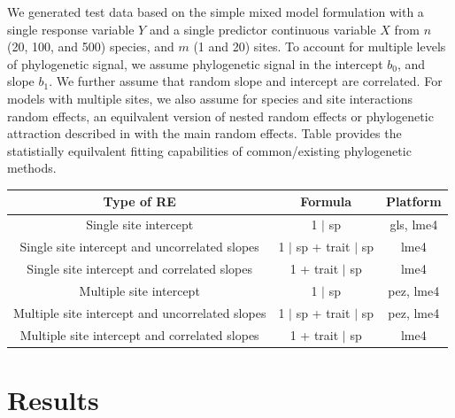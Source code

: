 We generated test data based on the simple mixed model formulation  with a single response variable $Y$ and a single predictor continuous variable $X$ from $n$ (20, 100, and 500) species, and $m$ (1 and 20) sites. 
To account for multiple levels of phylogenetic signal, we assume phylogenetic signal in the intercept $b_0$, and slope $b_1$.
We further assume that random slope and intercept are correlated. 
For models with multiple sites, we also assume for species and site interactions random effects, an equilvalent version of nested random effects or phylogenetic attraction described in \cite{helmus2007separating} with the main random effects.
Table  provides the statistially equilvalent fitting capabilities of common/existing phylogenetic methods.

\begin{tabular}{|c|c|c|}
\hline
Type of RE	& Formula	& Platform	\\
\hline

Single site intercept	  &	1 $\mid$ sp	& gls, lme4 \\
Single site intercept and uncorrelated slopes		&  1 $\mid$ sp + trait $\mid$ sp		& lme4 \\
Single site intercept and correlated slopes 			& 1 + trait $\mid$ sp					& lme4 \\
\hline
Multiple site intercept 									&  1 $\mid$ sp 						& pez, lme4 \\
Multiple site intercept and uncorrelated slopes 	&  1 $\mid$ sp + trait $\mid$ sp 		& pez, lme4 \\
Multiple site intercept and correlated slopes 	& 	1 + trait $\mid$ sp					& lme4 \\
\hline
\end{tabular}

\section{Results}

